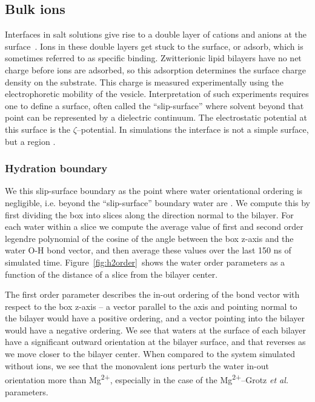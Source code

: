 \documentclass[journal=langd5,manuscript=article]{achemso}
\newcommand{\etal}{\textit{et al.}~}
\newcommand{\mgmicro}{Mg\textsuperscript{2+}--Grotz \etal}
\begin{document}
\subsection{Bulk ions}

Interfaces in salt solutions give rise to a double layer of cations and anions at the surface~\cite{israelachvili:2011:intermol}. 
Ions in these double layers get stuck to the surface, or adsorb, which is sometimes referred to as specific binding. Zwitterionic lipid bilayers have no net charge before ions are adsorbed,
so this adsorption
determines the surface charge density on the substrate. This charge is measured experimentally using the electrophoretic mobility of the vesicle. Interpretation
of such experiments requires one to define a surface, often called the ``slip-surface'' where solvent 
beyond that point
can be represented by a dielectric continuum. The electrostatic potential at this surface is the $\zeta$--potential.
In simulations the interface is not a simple surface, but a region . 

\subsubsection{Hydration boundary}
We  this 
slip-surface boundary as the point where 
water orientational ordering is negligible, i.e.
beyond the ``slip-surface'' 
boundary water  
are .
We compute this by first dividing the box into 
slices along the direction normal to the bilayer. 
For each water within a slice we 
compute the average value of first and second order legendre polynomial of 
the cosine of the angle between the box z-axis and
the water O-H bond vector, and then average these values over the last 150 ns of simulated time.
Figure~\ref{fig:h2order}~shows the water order parameters 
as a function of the distance of a slice from the bilayer center.

The first order parameter describes the in-out ordering of the bond vector with respect to the 
box z-axis -- a vector parallel to the axis and pointing normal to the bilayer would have a positive
ordering, and a vector pointing into the bilayer would have a negative ordering. We see that waters at the surface
of each bilayer have a significant outward orientation at the bilayer surface, and that reverses as we move
closer to the bilayer center. When compared to the system simulated without ions, we see that
the monovalent ions perturb the water in-out orientation 
more than Mg\textsuperscript{2+}, especially in the case of the \mgmicro
parameters.
\end{document}
